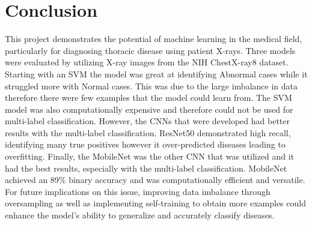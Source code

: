 \documentclass{article}
\theoremstyle{plain}
\theoremstyle{definition}
\theoremstyle{remark}
\begin{document}
\section{Conclusion}
This project demonstrates the potential of machine learning in the medical field, particularly for
diagnosing thoracic disease using patient X-rays. Three models were evaluated by utilizing
X-ray images from the NIH ChestX-ray8 dataset. Starting with an SVM the model was great at
identifying Abnormal cases while it struggled more with Normal cases. This was due to the large
imbalance in data therefore there were few examples that the model could learn from. The SVM
model was also computationally expensive and therefore could not be used for multi-label
classification. However, the CNNs that were developed had better results with the multi-label
classification. ResNet50 demonstrated high recall, identifying many true positives however it
over-predicted diseases leading to overfitting. Finally, the MobileNet was the other CNN that
was utilized and it had the best results, especially with the multi-label classification. MobileNet
achieved an 89\% binary accuracy and was computationally efficient and versatile. For future
implications on this issue, improving data imbalance through oversampling as well as
implementing self-training to obtain more examples could enhance the model’s ability to
generalize and accurately classify diseases.




\nocite{jbrownlee}
\nocite{fchollet}
\nocite{mobilenet}
\nocite{svm}
\nocite{tensorflow}
\nocite{athakur}
\nocite{chestx-ray}
\nocite{cnn}




\clearpage
{}
\end{document}
